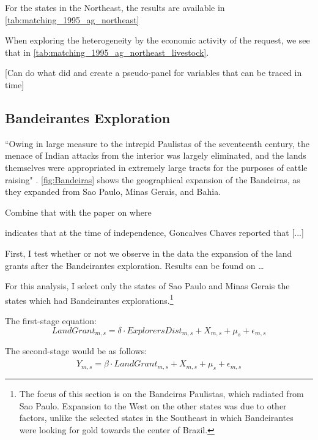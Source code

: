 \documentclass{article}
\begin{document}
For the states in the Northeast, the results are available in \autoref{tab:matching_1995_ag_northeast}

When exploring the heterogeneity by the economic activity of the request, we see that in \autoref{tab:matching_1995_ag_northeast_livestock}.

[Can do what \parencite{Rocha2017-yq} did and create a pseudo-panel for variables that can be traced in time]

\subsection{Bandeirantes Exploration}

``Owing in large measure to the intrepid Paulistas of the seventeenth century, the menace of Indian attacks from the interior was largely eliminated, and the lands themselves were appropriated in extremely large tracts for the purposes of cattle raising" \parencite[p.~320]{Smith1972-dv}.
\autoref{fig:Bandeiras} shows the geographical expansion of the Bandeiras, as they expanded from Sao Paulo, Minas Gerais, and Bahia.

Combine that with the \parencite{Barsanetti2023-xq} paper on where 

\textcite[p.~44]{Lima1954-td} indicates that at the time of independence, Goncalves Chaves reported that [...]

First, I test whether or not we observe in the data the expansion of the land grants after the Bandeirantes exploration.
Results can be found on \dots

For this analysis, I select only the states of Sao Paulo and Minas Gerais the states which had Bandeirantes explorations.\footnote{The focus of this section is on the Bandeiras Paulistas, which radiated from Sao Paulo. Expansion to the West on the other states was due to other factors, unlike the selected states in the Southeast in which Bandeirantes were looking for gold towards the center of Brazil.}

The first-stage equation:
\begin{equation}
  \label{eqn:firststage}
  LandGrant_{m,s} = \delta \cdot ExplorersDist_{m,s} +  X_{m,s} + \mu_s  + \epsilon_{m,s}
\end{equation}

The second-stage would be as follows:
\begin{equation}
  \label{eqn:ivequation}
  Y_{m,s} = \beta \cdot \widehat{LandGrant}_{m,s} + X_{m,s} + \mu_s +  \epsilon_{m,s}
\end{equation}
\end{document}
